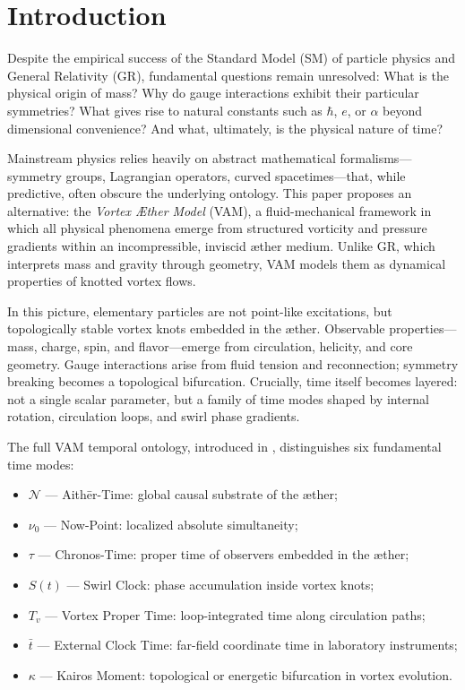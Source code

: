 \section{Introduction}\label{sec:inleiding}

Despite the empirical success of the Standard Model (SM) of particle physics and General Relativity (GR), fundamental questions remain unresolved: What is the physical origin of mass? Why do gauge interactions exhibit their particular symmetries? What gives rise to natural constants such as $\hbar$, $e$, or $\alpha$ beyond dimensional convenience? And what, ultimately, is the physical nature of time?

Mainstream physics relies heavily on abstract mathematical formalisms—symmetry groups, Lagrangian operators, curved spacetimes—that, while predictive, often obscure the underlying ontology. This paper proposes an alternative: the \emph{Vortex Æther Model} (VAM), a fluid-mechanical framework in which all physical phenomena emerge from structured vorticity and pressure gradients within an incompressible, inviscid æther medium. Unlike GR, which interprets mass and gravity through geometry, VAM models them as dynamical properties of knotted vortex flows.

In this picture, elementary particles are not point-like excitations, but topologically stable vortex knots embedded in the æther. Observable properties—mass, charge, spin, and flavor—emerge from circulation, helicity, and core geometry. Gauge interactions arise from fluid tension and reconnection; symmetry breaking becomes a topological bifurcation. Crucially, time itself becomes layered: not a single scalar parameter, but a family of time modes shaped by internal rotation, circulation loops, and swirl phase gradients.

The full VAM temporal ontology, introduced in \cite{iskandarani2025swirlgravity}, distinguishes six fundamental time modes:
\begin{itemize}
    \item $\mathcal{N}$ — Aithēr-Time: global causal substrate of the æther;
    \item $\nu_0$ — Now-Point: localized absolute simultaneity;
    \item $\tau$ — Chronos-Time: proper time of observers embedded in the æther;
    \item $S(t)$ — Swirl Clock: phase accumulation inside vortex knots;
    \item $T_v$ — Vortex Proper Time: loop-integrated time along circulation paths;
    \item $\bar{t}$ — External Clock Time: far-field coordinate time in laboratory instruments;
    \item $\kappa$ — Kairos Moment: topological or energetic bifurcation in vortex evolution.
\end{itemize}

